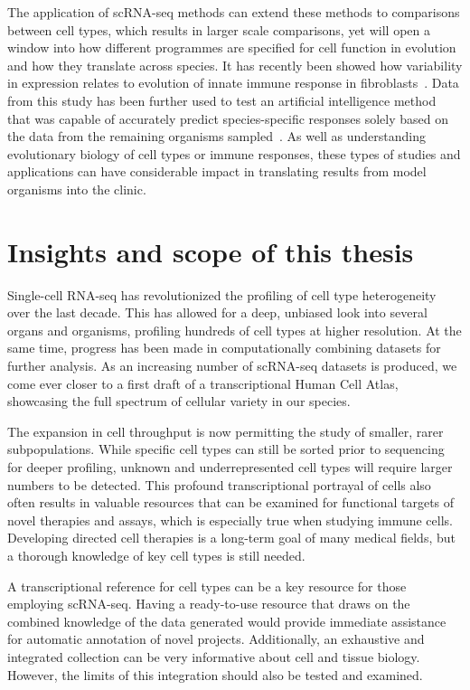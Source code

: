 The application of scRNA-seq methods can extend these methods to comparisons between cell types, which results in larger scale comparisons, yet will open a window into how different programmes are specified for cell function in evolution and how they translate across species. It has recently been showed how variability in expression relates to evolution of innate immune response in fibroblasts~\citep{hagai_gene_2018}. Data from this study has been further used to test an artificial intelligence method that was capable of accurately predict species-specific responses solely based on the data from the remaining organisms sampled~\citep{lotfollahi_generative_2018}. As well as understanding evolutionary biology of cell types or immune responses, these types of studies and applications can have considerable impact in translating results from model organisms into the clinic.



\section{Insights and scope of this thesis}  %
\label{section1.6}

Single-cell RNA-seq has revolutionized the profiling of cell type heterogeneity over the last decade. This has allowed for a deep, unbiased look into several organs and organisms, profiling hundreds of cell types at higher resolution. At the same time, progress has been made in computationally combining datasets for further analysis. As an increasing number of scRNA-seq datasets is produced, we come ever closer to a first draft of a transcriptional Human Cell Atlas, showcasing the full spectrum of cellular variety in our species.

The expansion in cell throughput is now permitting the study of smaller, rarer subpopulations. While specific cell types can still be sorted prior to sequencing for deeper profiling, unknown and underrepresented cell types will require larger numbers to be detected. This profound transcriptional portrayal of cells also often results in valuable resources that can be examined for functional targets of novel therapies and assays, which is especially true when studying immune cells. Developing directed cell therapies is a long-term goal of many medical fields, but a thorough knowledge of key cell types is still needed.

A transcriptional reference for cell types can be a key resource for those employing scRNA-seq. Having a ready-to-use resource that draws on the combined knowledge of the data generated would provide immediate assistance for automatic annotation of novel projects. Additionally, an exhaustive and integrated collection can be very informative about cell and tissue biology. However, the limits of this integration should also be tested and examined.

